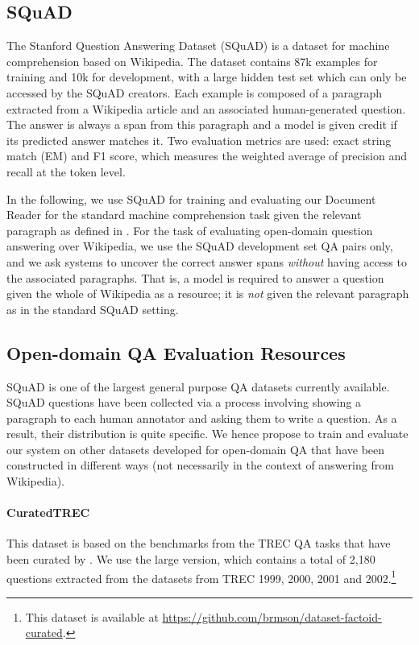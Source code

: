 \documentclass[11pt,a4paper]{article}
\newcommand\lcurq{CuratedTREC\xspace}
\begin{document}
\subsection{SQuAD}

The Stanford Question Answering Dataset (SQuAD) \cite{rajpurkar2016squad} is a dataset for machine comprehension based on Wikipedia.
%
The dataset contains 87k examples for training and 10k for development, with a large hidden test set which can only be accessed by the SQuAD creators.
%
Each example is composed of a paragraph extracted from a Wikipedia article and an associated human-generated question. The answer is always a span from this paragraph and a model is given credit if its predicted answer matches it. Two evaluation metrics are used: exact string match (EM) and F1 score, which measures the weighted average of precision and recall at the token level.

In the following, we use SQuAD for training and evaluating our Document Reader for the standard machine comprehension task given the relevant paragraph as defined in \cite{rajpurkar2016squad}.
%
For the task of evaluating open-domain question answering over Wikipedia, we use the SQuAD development set QA pairs only, and we ask systems to uncover the correct answer spans \emph{without} having access to the associated paragraphs. That is, a model is required to answer a question given the whole of Wikipedia as a resource; it is {\em not} given the relevant paragraph as in the standard SQuAD setting.

\subsection{Open-domain QA Evaluation Resources}\label{sec:othersources}

SQuAD is one of the largest general purpose QA datasets currently available.
SQuAD questions have been collected via a process involving showing a paragraph to each human annotator and asking them to write a question. As a result, their distribution is quite specific.
%
We hence propose to train and evaluate our system on other datasets developed for open-domain QA that have been constructed in different ways (not necessarily in the context of answering from Wikipedia).


\paragraph{\lcurq} This dataset is based on the
benchmarks from the TREC QA tasks that have been curated by \citet{baudivs2015modeling}.
%
%
We use the large version, which contains a total of 2,180 questions extracted from the datasets from TREC 1999, 2000, 2001 and 2002.\footnote{This dataset is available at \url{https://github.com/brmson/dataset-factoid-curated}.}
\end{document}
